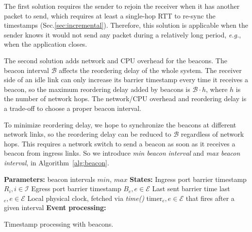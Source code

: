 The first solution requires the sender to rejoin the receiver when it has another packet to send, which requires at least a single-hop RTT to re-sync the timestamps (Sec.\ref{sec:incremental}). Therefore, this solution is applicable when the sender knows it would not send any packet during a relatively long period, \textit{e.g.}, when the application closes.

The second solution adds network and CPU overhead for the beacons. The beacon interval $\mathcal{B}$ affects the reordering delay of the whole system. The receiver side of an idle link can only increase its barrier timestamp every time it receives a beacon, so the maximum reordering delay added by beacons is $\mathcal{B} \cdot h$, where $h$ is the number of network hops. The network/CPU overhead and reordering delay is a trade-off to choose a proper beacon interval.

To minimize reordering delay, we hope to synchronize the beacons at different network links, so the reordering delay can be reduced to $\mathcal{B}$ regardless of network hops. This requires a network switch to send a beacon as soon as it receives a beacon from ingress links. So we introduce \textit{min beacon interval} and \textit{max beacon interval}, in Algorithm~\ref{alg:beacon}.

\setlength{\textfloatsep}{1em}
\begin{algorithm}[t]
 \DontPrintSemicolon
 \textbf{Parameters:} beacon intervals $min$, $max$\;
 \textbf{States:} Ingress port barrier timestamp $R_i, i \in \mathcal{I}$\;
   \qquad Egress port barrier timestamp $B_e, e \in \mathcal{E}$\;
   \qquad Last sent barrier time last$_e, e \in \mathcal{E}$\;
   \qquad Local physical clock, fetched via \textit{time()}\;
   \qquad timer$_e, e \in \mathcal{E}$ that fires after a given interval\;
 \textbf{Event processing:}\\
 \caption{Timestamp processing with beacons.}
 \label{alg:beacon}
\end{algorithm}

